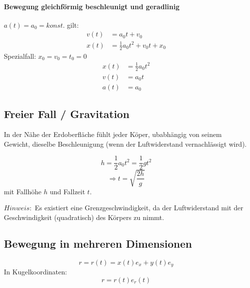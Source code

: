 \documentclass[7pt]{article}
\begin{document}
\begin{multicols*}{3}
\paragraph{Bewegung gleichf{\"o}rmig beschleunigt und geradlinig}\mbox{} 
$a(t) = a_0 = konst.$ gilt: \newline
\begin{equation*}
\begin{split}
		v(t)& = a_0t + v_0  \\
	x(t)& = \frac{1}{2}a_0t^2 + v_0t + x_0
\end{split}
\end{equation*}
\newline
Spezialfall: $x_0 = v_0 = t_0 = 0$ \newline
\begin{equation*}
\begin{split}
	x(t)& = \frac{1}{2}a_0t^2 \\
	v(t)& = a_0t \\
	a(t)& = a_0
\end{split}
\end{equation*}

\subsection{Freier Fall / Gravitation}
In der N{\"a}he der Erdoberfl{\"a}che f{\"u}hlt jeder K{\"o}per, ubabh{\"a}ngig von seinem Gewicht, dieselbe Beschleunigung (wenn der Luftwiderstand vernachl{\"a}ssigt wird).

\begin{equation*}
	h = \frac{1}{2}a_0t^2 = \frac{1}{2}gt^2
\end{equation*}
\begin{equation*}
\Rightarrow t = \sqrt{\frac{2h}{g}}
\end{equation*}
mit Fallh{\"o}he $h$ und Fallzeit $t$.
\newline

$Hinweis:$ Es existiert eine Grenzgeschwindigkeit, da der Luftwiderstand mit der Geschwindigkeit (quadratisch) des K{\"o}rpers zu nimmt.


\subsection{Bewegung in mehreren Dimensionen}
\begin{equation*}
r = r(t) = x(t) e_x + y(t) e_y
\end{equation*}
In Kugelkoordinaten:
\begin{equation*}
r = r(t)e_r(t)
\end{equation*}


\end{multicols*}
\end{document}
